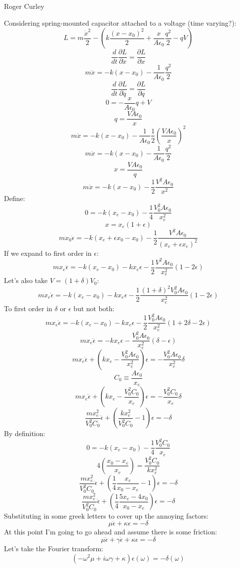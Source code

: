 \documentclass[final]{article}
\begin{document}
\begin{flushright}
Roger Curley
\end{flushright}
Considering spring-mounted capacitor attached to a voltage (time varying?):
\[L=m\frac{\dot x^2}{2}-\left(k\frac{(x-x_0)^2}{2}+\frac{x}{A\epsilon_0} \frac{q^2}{2}-qV\right)\]
\[\frac{d}{dt} \frac{\partial L}{\partial \dot x}=\frac{\partial L}{\partial x}\]
\[m\ddot x=-k(x-x_0)-\frac{1}{A\epsilon_0} \frac{q^2}{2}\]
\[\frac{d}{dt} \frac{\partial L}{\partial \dot q}=\frac{\partial L}{\partial q}\]
\[0=-\frac{x}{A\epsilon_0} q+V\]
\[q=\frac{VA\epsilon_0}{x}\]
\[m\ddot x=-k(x-x_0)-\frac{1}{A\epsilon_0} \frac{1}{2}\left(\frac{VA\epsilon_0}{x}\right)^2\]
\[m\ddot x=-k(x-x_0)-\frac{1}{A\epsilon_0} \frac{q^2}{2}\]
\[x=\frac{VA\epsilon_0}{q}\]
\[m\ddot x=-k(x-x_0)-\frac{1}{2}\frac{V^2A\epsilon_0}{x^2}\]
Define:
\[0=-k(x_e-x_0)-\frac{1}{4}\frac{V_0^2A\epsilon_0}{x_e^2}\]
\[x=x_e(1+\epsilon)\]
\[mx_0 \ddot \epsilon=-k(x_e+\epsilon x_0-x_0)-\frac{1}{2}\frac{V^2A\epsilon_0}{(x_e+\epsilon x_e)^2}\]
If we expand to first order in \(\epsilon\):
\[mx_e \ddot \epsilon=-k(x_e-x_0)-kx_e\epsilon-\frac{1}{2}\frac{V^2A\epsilon_0}{x_e^2}(1-2\epsilon)\]
Let's also take \(V=(1+\delta) V_0\):
\[mx_e \ddot \epsilon=-k(x_e-x_0)-kx_e\epsilon-\frac{1}{2}\frac{(1+\delta)^2 V_0^2A\epsilon_0}{x_e^2}(1-2\epsilon)\]
To first order in \(\delta\) or \(\epsilon\) but not both:
\[mx_e \ddot \epsilon=-k(x_e-x_0)-kx_e\epsilon-\frac{1}{2}\frac{V_0^2A\epsilon_0}{x_e^2}(1+2\delta-2\epsilon)\]
\[mx_e \ddot \epsilon=-kx_e\epsilon-\frac{V_0^2A\epsilon_0}{x_e^2}(\delta-\epsilon)\]
\[mx_e \ddot \epsilon+\left(kx_e-\frac{V_0^2A\epsilon_0}{x_e^2}\right)\epsilon=-\frac{V_0^2A\epsilon_0}{x_e^2}\delta\]
\[C_0\equiv\frac{A\epsilon_0}{x_e}\]
\[mx_e \ddot \epsilon+\left(kx_e-\frac{V_0^2C_0}{x_e}\right)\epsilon=-\frac{V_0^2C_0}{x_e}\delta\]
\[\frac{mx_e^2}{V_0^2C_0} \ddot \epsilon+\left(\frac{kx_e^2}{V_0^2C_0}-1\right)\epsilon=-\delta\]
By definition:
\[0=-k(x_e-x_0)-\frac{1}{4}\frac{V_0^2C_0}{x_e}\]
\[4\left(\frac{x_0-x_e}{x_e}\right)=\frac{V_0^2C_0}{kx_e^2}\]
\[\frac{mx_e^2}{V_0^2C_0} \ddot \epsilon+\left(\frac{1}{4}\frac{x_e}{x_0-x_e}-1\right)\epsilon=-\delta\]
\[\frac{mx_e^2}{V_0^2C_0} \ddot \epsilon+\left(\frac{1}{4}\frac{5x_e-4x_0}{x_0-x_e}\right)\epsilon=-\delta\]
Substituting in some greek letters to cover up the annoying factors:
\[\mu \ddot \epsilon+\kappa \epsilon=-\delta\]
At this point I'm going to go ahead and assume there is some friction:
\[\mu \ddot \epsilon+\gamma \dot \epsilon+\kappa \epsilon= -\delta\]
Let's take the Fourier transform:
\[(-\omega^2\mu+i\omega\gamma+\kappa)\epsilon(\omega)= -\delta(\omega)\]
\end{document}
